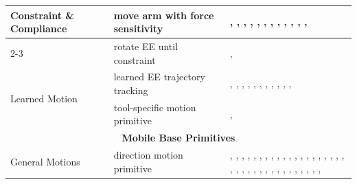 \begin{table}[!h]
\begin{tabular}{|p{4cm}|p{5cm}|p{15cm}|}
\hline
\multirow{2}{*}{\parbox{4cm}{Constraint \& Compliance}}
    & move arm with force sensitivity & \cite{Forster2020AutomaticEO}, \cite{Huang2013BehaviorB}, \cite{Youngquist2022EvaluatingSA}, \cite{Pohl2024MAkEableMA}, \cite{Li2019ManipulationSA}, \cite{Beetz2016OpenRR}, \cite{Karumanchi2017TeamRS}, \cite{Huang2008ACB}, \cite{Waarsing2001IntroducingRI}, \cite{Kotecha2024AHM}, \cite{Gller2024APB}, \cite{Knobbe2022CorePI}, \cite{Guo2025AdaptiveSC} \\
\cline{2-3}
    & rotate EE until constraint      & \cite{Koch2017ASR}, \cite{Knobbe2022CorePI} \\
\hline
\multirow{2}{*}{\parbox{3cm}{Learned Motion}}
    & learned EE trajectory tracking  & \cite{Zhao2025ACL}, \cite{Ning2023InverseKA}, \cite{Gmez2012KinestheticTV}, \cite{Niekum2012LearningAG}, \cite{Deng2017ReinforcementLO}, \cite{Li2017ReinforcementLO}, \cite{Short2019SAILSA}, \cite{Kiyokawa2025SelfSupervisedLO}, \cite{Yang2023LearnTC}, \cite{Kim2022LearningAG}, \cite{Carvalho2025ParameterFreeSO}, \cite{Caro2025PushSN} \\
\cline{2-3}
    & tool-specific motion primitive  & \cite{Stckler2014AdaptiveTS}, \cite{Yamazaki2012HomeAssistantRF} \\
\hline
\multicolumn{3}{|c|}{\textbf{Mobile Base Primitives}} \\
\hline
\multirow{2}{*}{\parbox{3cm}{General Motions}}
    & direction motion primitive            & \cite{Gray2013ASP}, \cite{Donald2024AnAF}, \cite{Huang2013BehaviorB}, \cite{Scholz2011CartPW}, \cite{Singh2013CoordinatingMM}, \cite{Laaksonen2010EmbodimentIM}, \cite{Yamazaki2012HomeAssistantRF}, \cite{Ding2022IntelligentAF}, \cite{Pedersen2014IntuitiveSP}, \cite{Settimi2016MotionPB}, \cite{Bouachari2018ObjectPC}, \cite{Stuckler2012RoboCupHomeDE}, \cite{Huang2023SkillTA}, \cite{Schwarz2018TeamNA}, \cite{Karumanchi2017TeamRS}, \cite{Finean2021WhereSI}, \cite{Chang2006ABB}, \cite{Huang2008ACB}, \cite{Stroupe2005BehaviorbasedMC}, \cite{Sequeira2000BehaviourbasedCB}, \cite{Aarno2008MotionIR}, \cite{Pimentel2002OnTD}, \cite{Knobbe2022CorePI}, \cite{Watanabe2024ImprovingRS}, \cite{Confente2025SkinMachineIW}, \cite{engelbracht2024spotlightroboticsceneunderstanding}, \cite{Lopes2026CARGOAM}, \cite{Lee2025LearningCL}, \cite{Gupta2025PreciseMM}, \cite{Bertoncelli2020LinearTM}, \cite{Xiao2025AutonomousBC}, \cite{Williams2012ARA}, \cite{Dadiotis2025DynamicOG}, \cite{Shan2026DockAnywhereDV}, \cite{Mounsif2020BAMBA}, \cite{Watanabe2025IntegratingBP}, \cite{Zhang2025AgentWorldAI} \\

\end{tabular}
\end{table}
